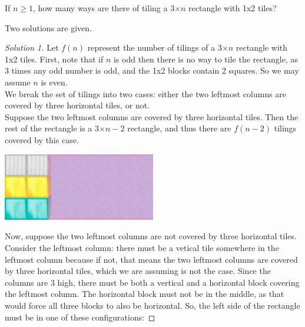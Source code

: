 \documentclass[12pt]{article}
\begin{document}
    \begin{myprob}{}{}
        If $n\geq1$, how many ways are there of tiling a 3$\times n$ rectangle with 1x2 tiles?

        Two solutions are given. 
        \begin{proof}[Solution 1]
            Let $f(n)$ represent the number of tilings of a 3$\times n$ rectangle with 1x2 tiles. First, note that if $n$ is odd then there is no way to tile the rectangle, as 3 times any odd number is odd, and the 1x2 blocks contain 2 squares. So we may assume $n$ is even.\\

            We break the set of tilings into two cases: either the two leftmost columns are covered by three horizontal tiles, or not.\\

            Suppose the two leftmost columns are covered by three horizontal tiles. Then the rest of the rectangle is a 3$\times n-2$ rectangle, and thus there are $f(n-2)$ tilings covered by this case.
            
            \begin{center}
                \includegraphics[width=0.5\textwidth]{Fig5.png}
            \end{center}

            Now, suppose the two leftmost columns are not covered by three horizontal tiles. Consider the leftmost column: there must be a vetical tile somewhere in the leftmost column because if not, that means the two leftmost columns are covered by three horizontal tiles, which we are assuming is not the case. Since the columns are 3 high, there must be both a vertical and a horizontal block covering the leftmost column. The horizontal block must not be in the middle, as that would force all three blocks to also be horizontal. So, the left side of the rectangle must be in one of these configurations:
            

\end{proof}
\end{myprob}
\end{document}

